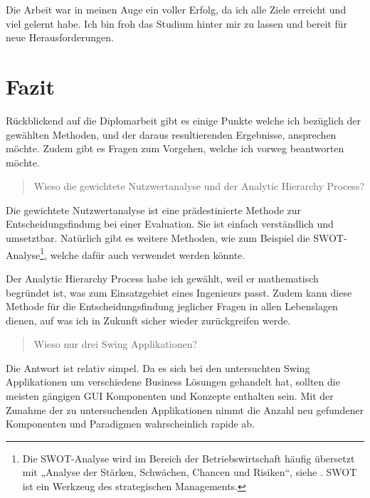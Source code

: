 Die Arbeit war in meinen Auge ein voller Erfolg, da ich alle Ziele erreicht und
viel gelernt habe. Ich bin froh das Studium hinter mir zu lassen und bereit für
neue Herausforderungen.

\section{Fazit}

Rückblickend auf die Diplomarbeit gibt es einige Punkte welche ich bezüglich der
gewählten Methoden, und der daraus resultierenden Ergebnisse, ansprechen möchte.
Zudem gibt es Fragen zum Vorgehen, welche ich vorweg beantworten möchte.
\newline

\begin{quote}\begin{itshape}Wieso die gewichtete Nutzwertanalyse und der
Analytic Hierarchy Process?\end{itshape}\end{quote}

Die gewichtete Nutzwertanalyse ist eine prädestinierte Methode zur
Entscheidungsfindung bei einer Evaluation. Sie ist einfach verständlich und
umsetztbar. Natürlich gibt es weitere Methoden, wie zum Beispiel die
SWOT-Analyse\footnote{Die SWOT-Analyse wird im Bereich der Betriebswirtschaft
häufig übersetzt mit „Analyse der Stärken, Schwächen, Chancen und
Risiken“, siehe \cite{SWOT}. SWOT ist ein Werkzeug des strategischen
Managements.}, welche dafür auch verwendet werden könnte.

Der Analytic Hierarchy Process habe ich gewählt, weil er mathematisch begründet
ist, was zum Einsatzgebiet eines Ingenieurs passt. Zudem kann diese Methode für
die Entscheidungsfindung jeglicher Fragen in allen Lebenslagen dienen, auf
was ich in Zukunft sicher wieder zurückgreifen werde.
\newline

\begin{quote}\begin{itshape}Wieso nur drei Swing
Applikationen?\end{itshape}\end{quote}

Die Antwort ist relativ simpel. Da es sich bei den untersuchten Swing
Applikationen um verschiedene Business Lösungen gehandelt hat, sollten die
meisten gängigen GUI Komponenten und Konzepte enthalten sein. Mit der Zunahme
der zu untersuchenden Applikationen nimmt die Anzahl neu gefundener Komponenten
und Paradigmen wahrscheinlich rapide ab.
\newline

